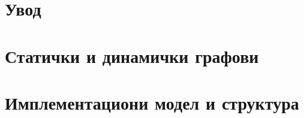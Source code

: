 \documentclass[12pt,oneside]{memoir}
\theoremstyle{definition}
\begin{document}
\frontmatter
\naslovna
\komisija
\posveta{}
\apstrakt
\tableofcontents*

\mainmatter


\chapter{Увод}



\chapter{Статички и динамички графови}

\label{chp:staticki_i_dinamicki_grafovi}

\chapter{Имплементациони модел и структура}
\end{document}
